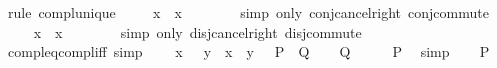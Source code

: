 \begin{isabellebody}
%
\isadelimproof
%
\endisadelimproof
%
\isatagproof
{}\isamarkupfalse%
\ {\isacharparenleft}{\kern0pt}rule\ compl{\isacharunderscore}{\kern0pt}unique{\isacharparenright}{\kern0pt}\isanewline
\ \ \isamarkupfalse%
\ {\isachardoublequoteopen}\isactrlbold {\isacharminus}{\kern0pt}\ x\ \isactrlbold {\isasymsqinter}\ x\ {\isacharequal}{\kern0pt}\ \isanewline
\ \ \ \ \isamarkupfalse%
\ {\isacharparenleft}{\kern0pt}simp\ only{\isacharcolon}{\kern0pt}\ conj{\isacharunderscore}{\kern0pt}cancel{\isacharunderscore}{\kern0pt}right\ conj{\isachardot}{\kern0pt}commute{\isacharparenright}{\kern0pt}\isanewline
\ \ \isamarkupfalse%
\ {\isachardoublequoteopen}\isactrlbold {\isacharminus}{\kern0pt}\ x\ \isactrlbold {\isasymsqunion}\ x\ {\isacharequal}{\kern0pt}\ \isanewline
\ \ \ \ \isamarkupfalse%
\ {\isacharparenleft}{\kern0pt}simp\ only{\isacharcolon}{\kern0pt}\ disj{\isacharunderscore}{\kern0pt}cancel{\isacharunderscore}{\kern0pt}right\ disj{\isachardot}{\kern0pt}commute{\isacharparenright}{\kern0pt}\isanewline
{}\isamarkupfalse%
%
\endisatagproof
{\isafoldproof}%
%
\isadelimproof
\isanewline
%
\endisadelimproof
\isanewline
{}\isamarkupfalse%
\ compl{\isacharunderscore}{\kern0pt}eq{\isacharunderscore}{\kern0pt}compl{\isacharunderscore}{\kern0pt}iff\ {\isacharbrackleft}{\kern0pt}simp{\isacharbrackright}{\kern0pt}{\isacharcolon}{\kern0pt}\ \isanewline
\ \ {\isacartoucheopen}\isactrlbold {\isacharminus}{\kern0pt}\ x\ {\isacharequal}{\kern0pt}\ \isactrlbold {\isacharminus}{\kern0pt}\ y\ {\isasymlongleftrightarrow}\ x\ {\isacharequal}{\kern0pt}\ y{\isacartoucheclose}\ \ {\isacharparenleft}{\kern0pt}\ {\isacartoucheopen}{\isacharquery}{\kern0pt}P\ {\isasymlongleftrightarrow}\ {\isacharquery}{\kern0pt}Q{\isacartoucheclose}{\isacharparenright}{\kern0pt}\isanewline
%
\isadelimproof
%
\endisadelimproof
%
\isatagproof
{}\isamarkupfalse%
\isanewline
\ \ \isamarkupfalse%
\ {\isacartoucheopen}{\isacharquery}{\kern0pt}Q{\isacartoucheclose}\isanewline
\ \ \isamarkupfalse%
\ \isamarkupfalse%
\ {\isacharquery}{\kern0pt}P\ \isamarkupfalse%
\ simp\isanewline
{}\isamarkupfalse%
\isanewline
\ \ \isamarkupfalse%
\ {\isacartoucheopen}{\isacharquery}{\kern0pt}P{\isacartoucheclose}\isanewline
\ \ \isamarkupfalse%
\ \isamarkupfalse%

\end{isabellebody}
